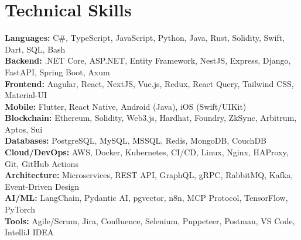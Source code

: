 \section{Technical Skills}
 \begin{itemize}[leftmargin=0.15in, label={}]
    \small{\item{
     \textbf{Languages:} C\#, TypeScript, JavaScript, Python, Java, Rust, Solidity, Swift, Dart, SQL, Bash \\
     \textbf{Backend:} .NET Core, ASP.NET, Entity Framework, NestJS, Express, Django, FastAPI, Spring Boot, Axum \\
     \textbf{Frontend:} Angular, React, NextJS, Vue.js, Redux, React Query, Tailwind CSS, Material-UI \\
     \textbf{Mobile:} Flutter, React Native, Android (Java), iOS (Swift/UIKit) \\
     \textbf{Blockchain:} Ethereum, Solidity, Web3.js, Hardhat, Foundry, ZkSync, Arbitrum, Aptos, Sui \\
     \textbf{Databases:} PostgreSQL, MySQL, MSSQL, Redis, MongoDB, CouchDB \\
     \textbf{Cloud/DevOps:} AWS, Docker, Kubernetes, CI/CD, Linux, Nginx, HAProxy, Git, GitHub Actions \\
     \textbf{Architecture:} Microservices, REST API, GraphQL, gRPC, RabbitMQ, Kafka, Event-Driven Design \\
     \textbf{AI/ML:} LangChain, Pydantic AI, pgvector, n8n, MCP Protocol, TensorFlow, PyTorch \\
     \textbf{Tools:} Agile/Scrum, Jira, Confluence, Selenium, Puppeteer, Postman, VS Code, IntelliJ IDEA
    }}
 \end{itemize}